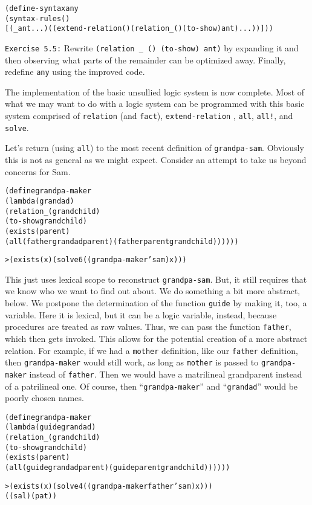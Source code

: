 \begin{alltt}
(define-syntax any
  (syntax-rules ()
    [(_ ant ...) ((extend-relation () (relation _ () (to-show) ant) ...))]))
\end{alltt}

\texttt{Exercise 5.5:} Rewrite \texttt{(relation \_ () (to-show) ant)}
by expanding it and then observing what parts of the remainder can be
optimized away.  Finally, redefine \texttt{any} using the improved
code.

The implementation of the basic unsullied logic system is now
complete.  Most of what we may want to do with a logic system can be
programmed with this basic system comprised of \texttt{relation}
(and \texttt{fact}), \texttt{extend-relation} , \texttt{all},
\texttt{all!}, and \texttt{solve}.

Let's return (using \texttt{all}) to the most recent definition of
\texttt{grandpa-sam}.  Obviously this is not as general as we might
expect.  Consider an attempt to take us beyond concerns for Sam.

\begin{alltt}
(define grandpa-maker
  (lambda (grandad)
    (relation _ (grandchild)
      (to-show grandchild)
      (exists (parent)
        (all (father grandad parent) (father parent grandchild))))))

> (exists (x) (solve 6 ((grandpa-maker 'sam) x)))
\end{alltt}

\noindent
This just uses lexical scope to reconstruct \texttt{grandpa-sam}.
But, it still requires that we know who we want to find out about. We
do something a bit more abstract, below.  We postpone the
determination of the function \texttt{guide} by making it, too, a
variable. Here it is lexical, but it can be a logic variable, instead,
because procedures are treated as raw values.  Thus, we can pass the function
\texttt{father}, which then gets invoked.  This allows for the
potential creation of a more abstract relation.  For example, if we
had a \texttt{mother} definition, like our \texttt{father} definition,
then \texttt{grandpa-maker} would still work, as long as
\texttt{mother} is passed to \texttt{grandpa-maker} instead of
\texttt{father}.  Then we would have a matrilineal grandparent instead
of a patrilineal one.  Of course, then ``\texttt{grandpa-maker}'' and
``\texttt{grandad}'' would be poorly chosen names.

\begin{alltt}
(define grandpa-maker
  (lambda (guide grandad)
    (relation _ (grandchild)
      (to-show grandchild)
      (exists (parent)
        (all (guide grandad parent) (guide parent grandchild))))))

> (exists (x) (solve 4 ((grandpa-maker father 'sam) x)))
((sal) (pat))
\end{alltt}

